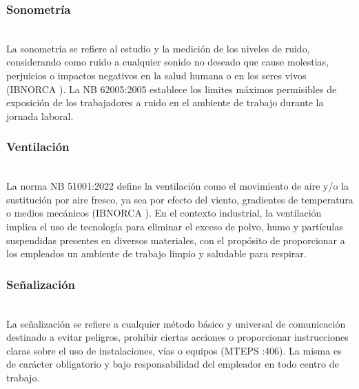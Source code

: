 \subsubsection{Sonometría}\hfill\\
\indent
La sonometría se refiere al estudio y la medición de los niveles de ruido, considerando como ruido a cualquier sonido no deseado que cause molestias, perjuicios o impactos negativos en la salud humana o en los seres vivos (IBNORCA \citeyear{NB62005}). La NB 62005:2005 establece los limites máximos permisibles de exposición de los trabajadores a ruido en el ambiente de trabajo durante la jornada laboral.

\subsubsection{Ventilación}\hfill\\
\indent
La norma NB 51001:2022 define la ventilación como el movimiento de aire y/o la sustitución por aire fresco, ya sea por efecto del viento, gradientes de temperatura o medios mecánicos (IBNORCA \citeyear{NB51002}). En el contexto industrial, la ventilación implica el uso de tecnología para eliminar el exceso de polvo, humo y partículas suspendidas presentes en diversos materiales, con el propósito de proporcionar a los empleados un ambiente de trabajo limpio y saludable para respirar.

\subsubsection{Señalización}\hfill\\
\indent
La señalización se refiere a cualquier método básico y universal de comunicación destinado a evitar peligros, prohibir ciertas acciones o proporcionar instrucciones claras sobre el uso de instalaciones, vías o equipos (MTEPS \citeyear{Bolivia1979}:406). La misma es de carácter obligatorio y bajo responsabilidad del empleador en todo centro de trabajo.

